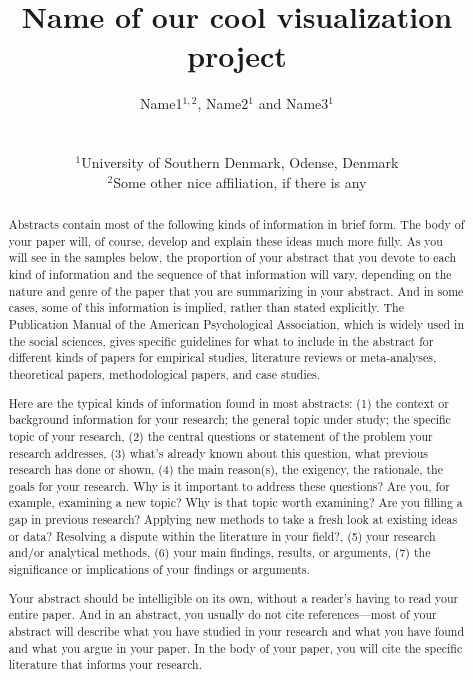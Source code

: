 \documentclass{egpubl}
\title[Our cool visualization project in short]%
      {Name of our cool visualization project}
\author[Name1, Name2 \& Name3]
{\parbox{\textwidth}{\centering Name1$^{1,2}$, Name2$^{1}$ and Name3$^{1}$
        }
        \\
{\parbox{\textwidth}{\centering $^1$University of Southern Denmark, Odense, Denmark\\
         $^2$Some other nice affiliation, if there is any
       }
}
}
\begin{document}

\maketitle
\begin{abstract}

Abstracts contain most of the following kinds of information in brief form. The body of your paper will, of course, develop and explain these ideas much more fully. As you will see in the samples below, the proportion of your abstract that you devote to each kind of information and the sequence of that information will vary, depending on the nature and genre of the paper that you are summarizing in your abstract. And in some cases, some of this information is implied, rather than stated explicitly. The Publication Manual of the American Psychological Association, which is widely used in the social sciences, gives specific guidelines for what to include in the abstract for different kinds of papers for empirical studies, literature reviews or meta-analyses, theoretical papers, methodological papers, and case studies.

Here are the typical kinds of information found in most abstracts:
(1) the context or background information for your research; the general topic under study; the specific topic of your research, (2) the central questions or statement of the problem your research addresses, (3) what’s already known about this question, what previous research has done or shown, (4) the main reason(s), the exigency, the rationale, the goals for your research. Why is it important to address these questions? Are you, for example, examining a new topic? Why is that topic worth examining? Are you filling a gap in previous research? Applying new methods to take a fresh look at existing ideas or data? Resolving a dispute within the literature in your field?, (5) your research and/or analytical methods, (6) your main findings, results, or arguments, (7) the significance or implications of your findings or arguments.

Your abstract should be intelligible on its own, without a reader’s having to read your entire paper. And in an abstract, you usually do not cite references—most of your abstract will describe what you have studied in your research and what you have found and what you argue in your paper. In the body of your paper, you will cite the specific literature that informs your research.

\end{abstract}  
\end{document}
